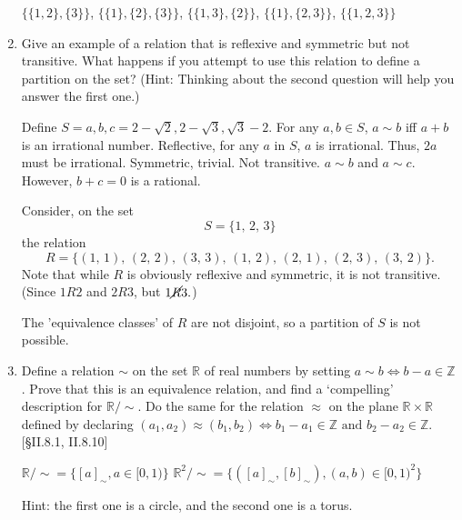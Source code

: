 \begin{enumerate}
\begin{solution}
                                $\{\{1,2\},\{3\}\}$, $\{\{1\}, \{2\}, \{3\}\}$, $\{\{1,3\},\{2\}\}$, $\{\{1\},\{2,3\}\}$, $\{\{1,2,3\}\}$
        \end{solution}
    \item Give an example of a relation that is reflexive and symmetric but not transitive. What happens if you attempt to use this relation to define a partition on the set? (Hint: Thinking about the second question will help you answer the first one.)
    \begin{solution}
            Define $S={a,b,c}={2-\sqrt{2},2-\sqrt{3},\sqrt{3}-2}$. For any $a,b \in S$, $a\sim b$ iff $a+b$ is an irrational number. 
            Reflective, for any $a$ in $S$, $a$ is irrational. Thus, $2a$ must be irrational. 
            Symmetric, trivial. 
            Not transitive. $a\sim b$ and $a\sim c$. However, $b+c =0$ is a rational.
    \end{solution}
    \begin{solution}
        Consider, on the set
        \[ S = \{1, \, 2, \, 3\} \]  
        the relation
        \[
            R = \{(1, \, 1), \, (2, \, 2), \, (3, \, 3), \, (1, \, 2), \, (2, \, 1), \, (2, \, 3), \, (3, \, 2)\}.
        \]
        Note that while $R$ is obviously reflexive and symmetric, it is not transitive. (Since $1R2$ and $2R3$, but $1 \cancel{R} 3.$)

        The 'equivalence classes' of $R$ are not disjoint, so a partition of $S$ is not possible.
    \end{solution}

    \item Define a relation $\sim$ on the set $\mathbb{R}$ of real numbers by setting $a \sim b \iff b-a \in \mathbb{Z}$. Prove that this is an equivalence relation, and find a `compelling' description for $\mathbb{R}/\sim$. Do the same for the relation $\approx$ on the plane $\mathbb{R} \times \mathbb{R}$ defined by declaring $(a_1, a_2) \approx (b_1, b_2) \iff b_1 - a_1 \in \mathbb{Z} \text{ and } b_2 - a_2 \in \mathbb{Z}$. [\S II.8.1, II.8.10]
    \begin{solution}
        $\mathbb{R}/\sim =\{[a]_{\sim}, a\in [0,1)\}$
        $\mathbb{R}^2/\sim = \{([a]_{\sim},[b]_{\sim}), (a,b)\in [0,1)^2\}$
        
    \end{solution}
    \begin{solution}
        Hint: the first one is a circle, and the second one is a torus.
    \end{solution}
\end{enumerate}
